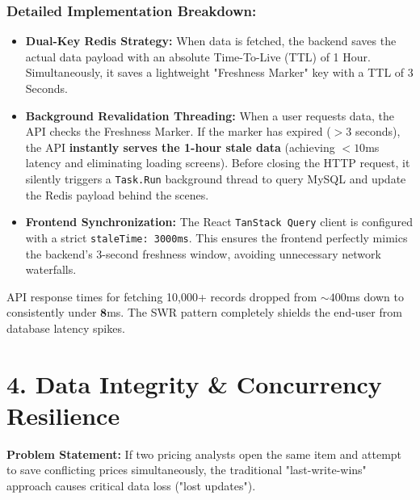 \documentclass[12pt,a4paper]{article}
\begin{document}
\subsubsection{Detailed Implementation Breakdown:}
\begin{itemize}[label=\textbullet]
    \item \textbf{Dual-Key Redis Strategy:} When data is fetched, the backend saves the actual data payload with an absolute Time-To-Live (TTL) of 1 Hour. Simultaneously, it saves a lightweight "Freshness Marker" key with a TTL of 3 Seconds.
    \item \textbf{Background Revalidation Threading:} When a user requests data, the API checks the Freshness Marker. If the marker has expired ($>3$ seconds), the API \textbf{instantly serves the 1-hour stale data} (achieving $<10$ms latency and eliminating loading screens). Before closing the HTTP request, it silently triggers a \texttt{Task.Run} background thread to query MySQL and update the Redis payload behind the scenes.
    \item \textbf{Frontend Synchronization:} The React \texttt{TanStack Query} client is configured with a strict \texttt{staleTime: 3000ms}. This ensures the frontend perfectly mimics the backend's 3-second freshness window, avoiding unnecessary network waterfalls.
\end{itemize}

\begin{enterprisebox}
API response times for fetching 10,000+ records dropped from $\sim400$ms down to consistently under $\mathbf{8}$ms. The SWR pattern completely shields the end-user from database latency spikes.
\end{enterprisebox}

\vspace{0.5cm}
\section{4. Data Integrity \& Concurrency Resilience}

\textbf{Problem Statement:} If two pricing analysts open the same item and attempt to save conflicting prices simultaneously, the traditional "last-write-wins" approach causes critical data loss ("lost updates").
\end{document}
